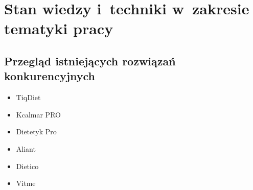 \chapter{Stan wiedzy i~techniki w~zakresie tematyki pracy}\label{ch:knowladge-state}
\section{Przegląd istniejących rozwiązań konkurencyjnych}\label{sec:competitive-solutions}
\begin{itemize}
    \item TiqDiet\cite{url:tiqdiet}
    \item Kcalmar PRO\cite{url:kcalmar}
    \item Dietetyk Pro\cite{url:dietetyk-pro}
    \item Aliant\cite{url:aliant}
    \item Dietico\cite{url:dietico}
    \item Vitme\cite{url:vitme}
\end{itemize}


